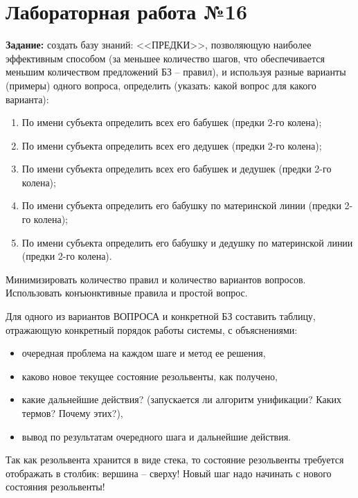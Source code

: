 \chapter{Лабораторная работа №16}

\textbf{Задание:} создать базу знаний: <<ПРЕДКИ>>, позволяющую наиболее эффективным способом (за меньшее количество шагов, что обеспечивается меньшим количеством предложений БЗ – правил), и используя разные варианты (примеры) одного вопроса, определить (указать: какой вопрос для какого варианта):

\begin{enumerate}
    \item По имени субъекта определить всех его бабушек (предки 2-го колена);
    \item По имени субъекта определить всех его дедушек (предки 2-го колена);
    \item По имени субъекта определить всех его бабушек и дедушек (предки 2-го колена);
    \item По имени субъекта определить его бабушку по материнской линии (предки 2-го колена);
    \item По имени субъекта определить его бабушку и дедушку по материнской линии (предки 2-го колена).
\end{enumerate}

Минимизировать количество правил и количество вариантов вопросов. Использовать конъюнктивные правила и простой вопрос.

Для одного из вариантов ВОПРОСА и конкретной БЗ составить таблицу, отражающую конкретный порядок работы системы, с объяснениями:

\begin{itemize}
    \item очередная проблема на каждом шаге и метод ее решения,
    \item каково новое текущее состояние резольвенты, как получено,
    \item какие дальнейшие действия? (запускается ли алгоритм унификации? Каких термов? Почему этих?),
    \item вывод по результатам очередного шага и дальнейшие действия.
\end{itemize}

Так как резольвента хранится в виде стека, то состояние резольвенты требуется отображать в столбик: вершина – сверху! Новый шаг надо начинать с нового состояния резольвенты!

